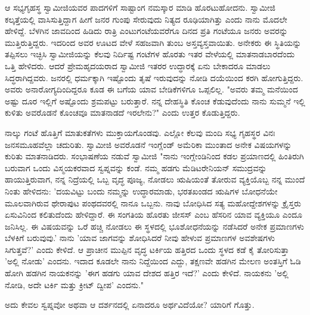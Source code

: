 ಆ ಸಭ್ಯಗೃಹಸ್ಥ ಸ್ವಾಮೀಜಿಯವರ ಪಾದಗಳಿಗೆ ಸಾಷ್ಟಾಂಗ ನಮಸ್ಕಾರ ಮಾಡಿ ಹೊರಟುಹೋದನು. ಸ್ವಾಮೀಜಿ ಕಲ್ಕತ್ತೆಯಲ್ಲಿ ವಾಸಿಸುತ್ತಿದ್ದಾಗ ಹೀಗೆ ಜನರ ಗುಂಪು ಸೇರುವುದು ನಿತ್ಯದ ರೂಢಿಯಾಗಿತ್ತು ಎಂದು ನಾನು ಮೊದಲೇ ಹೇಳಿದ್ದೆ. ಬೆಳಗಿನ ಜಾವದಿಂದ ಹಿಡಿದು ರಾತ್ರಿ ಎಂಟುಗಂಟೆಯವರೆಗೂ ದಿನದ ಪ್ರತಿ ಗಂಟೆಯೂ ಜನರು ಅವರನ್ನು ಮುತ್ತಿರುತ್ತಿದ್ದರು. ಇದರಿಂದ ಅವರ ಊಟದ ವೇಳೆ ಸಹಜವಾಗಿ ತುಂಬ ಅಸ್ತವ್ಯಸ್ತವಾಯಿತು. ಅನೇಕರು ಈ ಸ್ಥಿತಿಯನ್ನು ತಪ್ಪಿಸಲು ಇಚ್ಛಿಸಿ ಸ್ವಾಮೀಜಿಯನ್ನು ಕೆಲವು ನಿರ್ದಿಷ್ಟ ಗಂಟೆಗಳ ಹೊರತು ಇತರ ವೇಳೆಯಲ್ಲಿ ಮಾತನಾಡಬಾರದೆಂದು ಒತ್ತಿ ಹೇಳಿದರು. ಆದರೆ ಪ್ರೇಮಹೃದಯರಾದ ಸ್ವಾಮೀಜಿ ಇತರರ ಉದ್ಧಾರಕ್ಕೆ ಏನು ಬೇಕಾದರೂ ಮಾಡಲು ಸಿದ್ಧರಾಗಿದ್ದವರು. ಜನರಲ್ಲಿ ಧರ್ಮಕ್ಕಾಗಿ ಇಷ್ಟೊಂದು ತೃಷೆ ಇರುವುದನ್ನು ನೋಡಿ ದಯೆಯಿಂದ ಕರಗಿ ಹೋಗುತ್ತಿದ್ದರು. ಅವರು ಅನಾರೋಗ್ಯದಿಂದಿದ್ದರೂ ಕೂಡ ಈ ಬಗೆಯ ಯಾವ ಬೇಡಿಕೆಗಳಿಗೂ ಒಪ್ಪಲಿಲ್ಲ. "ಅವರು ತಮ್ಮ ಮನೆಯಿಂದ ಅಷ್ಟು ದೂರ ಇಲ್ಲಿಗೆ ಅಷ್ಟೊಂದು ಶ್ರಮಪಟ್ಟು ಬರುತ್ತಾರೆ. ನನ್ನ ದೇಹಸ್ಥಿತಿ ಕೊಂಚ ಕೆಡುವುದೆಂದು ನಾನು ಸುಮ್ಮನೆ ಇಲ್ಲಿ ಕುಳಿತು ಅವರೊಡನೆ ಕೊಂಚವೂ ಮಾತನಾಡದೆ ಇರಲೇನು?" ಎಂದು ಉತ್ತರ ಕೊಡುತ್ತಿದ್ದರು.

ನಾಲ್ಕು ಗಂಟೆ ಹೊತ್ತಿಗೆ ಮಾತುಕತೆಗಳು ಮುಕ್ತಾಯಗೊಂಡವು. ಎಲ್ಲೋ ಕೆಲವು ಮಂದಿ ಸಭ್ಯ ಗೃಹಸ್ಥರ ವಿನಃ ಜನಸಮೂಹವೆಲ್ಲಾ ಚದುರಿತು. ಸ್ವಾಮೀಜಿ ಅವರೊಡನೆ ಇಂಗ್ಲೆಂಡ್ ಅಮೆರಿಕಾ ಮುಂತಾದ ಅನೇಕ ವಿಷಯಗಳನ್ನು ಕುರಿತು ಮಾತನಾಡಿದರು. ಸಂಭಾಷಣೆಯ ನಡುವೆ ಸ್ವಾಮೀಜಿ "ನಾನು ಇಂಗ್ಲೇಂಡಿನಿಂದ ಕಡಲ ಪ್ರಯಾಣದಲ್ಲಿ ಹಿಂತಿರುಗಿ ಬರುವಾಗ ಒಂದು ವಿಸ್ಮಯಕರವಾದ ಸ್ವಪ್ನವನ್ನು ಕಂಡೆ. ನಮ್ಮ ಹಡಗು ಮೆಡಿಟರೇನಿಯನ್ ಸಮುದ್ರವನ್ನು ಹಾಯುತ್ತಿರುವಾಗ, ನನ್ನ ನಿದ್ರೆಯಲ್ಲಿ ಒಬ್ಬ ವೃದ್ಧ ಪೂಜ್ಯ, ನೋಡಲು ಋಷಿಯಂತೆ ತೋರುವ ವ್ಯಕ್ತಿಯೊಬ್ಬ ನನ್ನ ಮುಂದೆ ನಿಂತು ಹೇಳಿದನು: 'ದಯವಿಟ್ಟು ಬಂದು ನಮ್ಮನ್ನು ಉದ್ಧಾರಮಾಡು, ಭರತಖಂಡದ ಋಷಿಗಳ ಬೋಧನೆಯೇ ಮೂಲವಾಗಿರುವ ಥೇರಾಪುಟ ಪಂಥದವರಲ್ಲಿ ನಾನೂ ಒಬ್ಬನು. ನಾವು ಬೋಧಿಸಿದ ಸತ್ಯ ಮಹೋದ್ದೇಶಗಳನ್ನು ಕ್ರೈಸ್ತರು ಏಸುವಿನಿಂದ ಕಲಿತುದೆಂದು ಹೇಳಿದ್ದಾರೆ. ಈ ಸಂಗತಿಯ ಹೊರತು ಜೀಸಸ್ ಎಂಬ ಹೆಸರಿನ ಯಾವ ವ್ಯಕ್ತಿಯೂ ಎಂದೂ ಜನಿಸಿಲ್ಲ. ಈ ವಿಷಯವನ್ನು ಒರೆ ಹಚ್ಚಿ ನೋಡಲು ಈ ಸ್ಥಳದಲ್ಲಿ ಭೂಶೋಧನೆಯನ್ನು ನಡೆಸಿದರೆ ಅನೇಕ ಪ್ರಮಾಣಗಳು ಬೆಳಕಿಗೆ ಬರುವುವು.' ನಾನು 'ಯಾವ ಜಾಗವನ್ನು ಶೋಧಿಸಿದರೆ ನೀವು ಹೇಳುವ ಪ್ರಮಾಣಗಳ ಅವಶೇಷಗಳು ಸಿಗುತ್ತವೆ?' ಎಂದು ಕೇಳಿದೆ. ಆ ಪ್ರಾಚೀನ ಮುಪ್ಪಿನ ವೃದ್ಧ ಟರ್ಕಿಯ ಹತ್ತಿರದ ಒಂದು ಸ್ಥಳದ ಕಡೆ ಕೈ ತೋರಿಸುತ್ತಾ 'ಅಲ್ಲಿ ನೋಡು' ಎಂದನು. ಇದಾದ ಕೂಡಲೇ ನಾನು ನಿದ್ದೆಯಿಂದ ಎದ್ದು, ತಕ್ಷಣವೇ ಹಡಗಿನ ಮೇಲಣ ಅಂತಸ್ತಿಗೆ ಓಡಿ ಹೋಗಿ ಹಡಗಿನ ನಾಯಕನನ್ನು 'ಈಗ ಹಡಗು ಯಾವ ದೇಶದ ಹತ್ತಿರ ಇದೆ?' ಎಂದು ಕೇಳಿದೆ. ನಾಯಕನು 'ಅಲ್ಲಿ ನೋಡಿ, ಅದೇ ಟರ್ಕಿ ಮತ್ತು ಕ್ರೀಟ್ ದ್ವೀಪ' ಎಂದನು."

ಅದು ಕೇವಲ ಸ್ವಪ್ನವೋ ಅಥವಾ ಆ ದರ್ಶನದಲ್ಲಿ ಏನಾದರೂ ಅರ್ಥವಿದೆಯೋ? ಯಾರಿಗೆ ಗೊತ್ತು.

